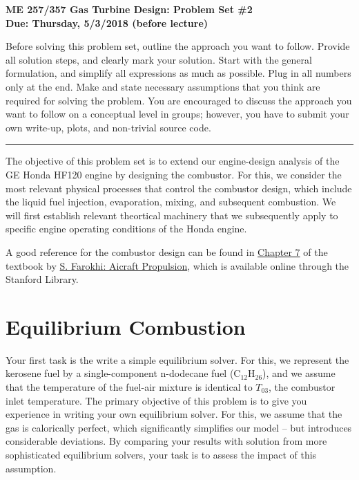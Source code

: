 \documentclass[11pt]{article}
\def\hwnum{2}
\begin{document}
\begin{center}
{\Large\bf ME 257/357 Gas Turbine Design: Problem Set \#\hwnum\\
       Due: Thursday, 5/3/2018 (before lecture)}
\end{center}

Before solving this problem set, outline the approach you want to follow. Provide all solution steps, and clearly mark your solution. Start with the general formulation, and simplify all expressions as much as possible. Plug in all numbers only at the end. Make and state necessary assumptions that you
think are required for solving the problem. You are encouraged to discuss the approach you want to follow on a conceptual level in groups; however, you have to submit your own write-up, plots, and non-trivial source code.
\\
\hrule
\vspace{2mm}
\noindent
The objective of this  problem set is to extend our engine-design analysis of the GE Honda HF120 engine  by designing the combustor. For this, we consider the most relevant physical processes that control the combustor design, which include the liquid fuel injection, evaporation, mixing, and subsequent combustion. We will first establish relevant theortical machinery that we subsequently apply to specific engine operating conditions of the Honda engine. 

A good reference for the combustor design can be found in \href{http://proquest.safaribooksonline.com/book/mechanical-engineering/9781118806760/7-combustion-chambers-and-afterburners/c07_xhtml}{Chapter 7} of the textbook by \href{http://proquest.safaribooksonline.com/9781118806760}{S. Farokhi: Aicraft Propulsion}, which is available online through the Stanford Library.
\section{Equilibrium Combustion}
Your first task is the write a simple equilibrium solver. For this, we represent the kerosene fuel by a single-component n-dodecane fuel (C$_{12}$H$_{26}$), and we assume that the temperature of the fuel-air mixture is identical to $T_{03}$, the combustor inlet temperature. The primary objective of this problem is to give you experience in writing your own equilibrium solver. For this, we assume that the gas is calorically perfect, which significantly simplifies our model -- but introduces considerable deviations. By comparing your results with solution from more sophisticated equilibrium solvers, your task is to assess the impact of this assumption. 
\end{document}
